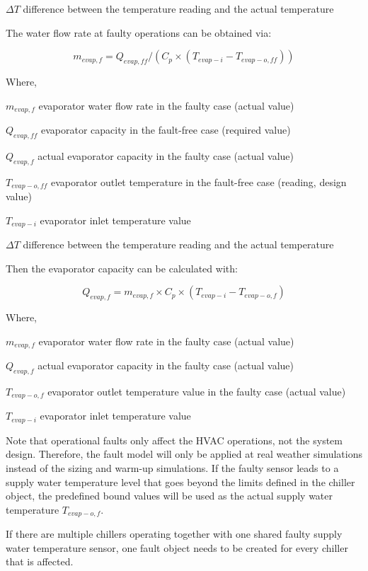 \(\Delta T\) difference between the temperature reading and the actual temperature

The water flow rate at faulty operations can be obtained via:

\begin{equation}
m_{evap,f} = Q_{evap,ff} / ( C_p \times (T_{evap-i} - T_{evap-o,ff} ) )
\end{equation}

Where, 

\(m_{evap,f}\) evaporator water flow rate in the faulty case (actual value)

\(Q_{evap,ff}\) evaporator capacity in the fault-free case (required value)

\(Q_{evap,f}\) actual evaporator capacity in the faulty case (actual value)

\(T_{evap-o,ff}\) evaporator outlet temperature in the fault-free case (reading, design value)

\(T_{evap-i}\) evaporator inlet temperature value 

\(\Delta T\) difference between the temperature reading and the actual temperature

Then the evaporator capacity can be calculated with:

\begin{equation}
Q_{evap,f} = m_{evap,f} \times C_p \times (T_{evap-i} - T_{evap-o,f} )
\end{equation}

Where, 

\(m_{evap,f}\) evaporator water flow rate in the faulty case (actual value)

\(Q_{evap,f}\) actual evaporator capacity in the faulty case (actual value)

\(T_{evap-o,f}\) evaporator outlet temperature value in the faulty case (actual value)

\(T_{evap-i}\) evaporator inlet temperature value 

Note that operational faults only affect the HVAC operations, not the system design. Therefore, the fault model will only be applied at real weather simulations instead of the sizing and warm-up simulations. If the faulty sensor leads to a supply water temperature level that goes beyond the limits defined in the chiller object, the predefined bound values will be used as the actual supply water temperature \(T_{evap-o,f}\).

If there are multiple chillers operating together with one shared faulty supply water temperature sensor, one fault object needs to be created for every chiller that is affected.

